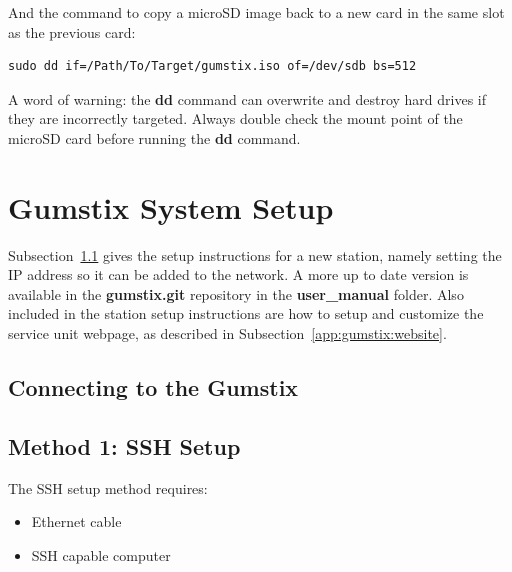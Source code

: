 And the command to copy a microSD image back to a new card in the same slot as the previous card:

\begin{verbatim}
sudo dd if=/Path/To/Target/gumstix.iso of=/dev/sdb bs=512
\end{verbatim}

A word of warning: the {\bf dd} command can overwrite and destroy hard drives if they are incorrectly targeted.
Always double check the mount point of the microSD card before running the {\bf dd} command.

\section{Gumstix System Setup}

Subsection~\ref{app:appendix:setup} gives the setup instructions for a new station, namely setting the IP address so it can be added to the network.
A more up to date version is available in the {\bf gumstix.git} repository in the {\bf user\_manual} folder.
Also included in the station setup instructions are how to setup and customize the service unit webpage, as described in Subsection~\ref{app:gumstix:website}.

\subsection{Connecting to the Gumstix}
\label{app:appendix:setup} 

\subsection*{Method 1: SSH Setup}
The SSH setup method requires:
\begin{itemize}
\item{Ethernet cable}
\item{SSH capable computer}
\end{itemize}

